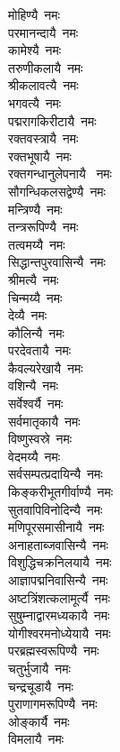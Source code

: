 \begin{multicols}{2}
\begin{flushleft}
मोहिण्यै~नमः \hfill{}\\
परमानन्दायै~नमः\\
कामेश्यै~नमः\\
तरुणीकलायै~नमः\\
श्रीकलावत्यै~नमः\\
भगवत्यै~नमः\\
पद्मरागकिरीटायै~नमः\\
रक्तवस्त्रायै~नमः\\
रक्तभूषायै~नमः\\
रक्तगन्धानुलेपनायै ~नमः\\
सौगन्धिकलसद्वेण्यै~नमः \hfill{}\\
मन्त्रिण्यै~नमः\\
तन्त्ररूपिण्यै~नमः\\
तत्वमय्यै~नमः\\
सिद्धान्तपुरवासिन्यै~नमः\\
श्रीमत्यै~नमः\\
चिन्मय्यै~नमः\\
देव्यै~नमः\\
कौलिन्यै~नमः\\
परदेवतायै~नमः\\
कैवल्यरेखायै~नमः \hfill{}\\
वशिन्यै~नमः\\
सर्वेश्वर्यै~नमः\\
सर्वमातृकायै~नमः\\
विष्णुस्वस्रे~नमः\\
वेदमय्यै~नमः\\
सर्वसम्पत्प्रदायिन्यै~नमः\\
किङ्करीभूतगीर्वाण्यै~नमः\\
सुतवापिविनोदिन्यै~नमः\\
मणिपूरसमासीनायै~नमः\\
अनाहताब्जवासिन्यै~नमः \hfill{}\\
विशुद्धिचक्रनिलयायै~नमः\\
आज्ञापद्मनिवासिन्यै~नमः\\
अष्टत्रिंशत्कलामूर्त्यै~नमः\\
सुषुम्नाद्वारमध्यकायै~नमः\\
योगीश्वरमनोध्येयायै~नमः\\
परब्रह्मस्वरूपिण्यै~नमः\\
चतुर्भुजायै~नमः\\
चन्द्रचूडायै~नमः\\
पुराणागमरूपिण्यै~नमः\\
ओङ्कार्यै~नमः \hfill{}\\
विमलायै~नमः\\

\end{flushleft}
\end{multicols}
